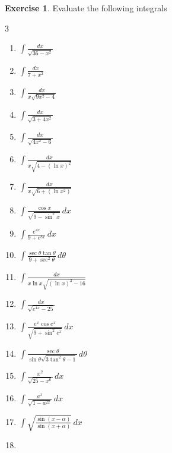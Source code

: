 \documentclass{book}
\theoremstyle{definition}
\newtheorem{exercise}{Exercise}[section]
\begin{document}
\begin{exercise}
Evaluate the following integrals
\begin{multicols}{3}
\begin{enumerate}[label=(\roman*)]
    \item $\displaystyle\int \frac{dx}{\sqrt{36-x^2}}$
    \item $\displaystyle\int \frac{dx}{7+x^2}$
    \item $\displaystyle\int \frac{dx}{x\sqrt{9x^2-4}}$
    \item $\displaystyle\int \frac{dx}{\sqrt{3+4x^2}}$
    \item $\displaystyle\int \frac{dx}{\sqrt{4x^2-6}}$
    \item $\displaystyle\int \frac{dx}{x\sqrt{4-(\ln x)^2}}$
    \item $\displaystyle\int \frac{dx}{x\sqrt{6+(\ln x^2)}}$
    \item $\displaystyle\int \frac{\cos x}{\sqrt{9-\sin^2 x}}\,dx$
    \item $\displaystyle\int \frac{e^{4x}}{9+e^{8x}}\,dx$
    \item $\displaystyle\int \frac{\sec\theta \tan\theta}{9+\sec^2 \theta}\,d\theta$
    \item $\displaystyle\int \frac{dx}{x \ln x\sqrt{(\ln x)^2-16}}$
    \item $\displaystyle\int \frac{dx}{\sqrt{e^{4x}-25}}$
    \item $\displaystyle\int \frac{e^x\cos e^x}{\sqrt{9+\sin^2e^x}}\,dx$
    \item $\displaystyle\int \frac{\sec\theta}{\sin\theta\sqrt{3\tan^2\theta-1}}\,d\theta$
    \item $\displaystyle\int \frac{x^2}{\sqrt{25-x^6}}\,dx$
    \item $\displaystyle\int\frac{a^x}{\sqrt{1-a^{2x}}}\,dx$
    \item $\displaystyle\int\sqrt{\frac{\sin (x-\alpha)}{\sin(x+\alpha)}}\,dx$
    \item[] \phantom{x}
\end{enumerate} 
\end{multicols}

\end{exercise}
\end{document}
